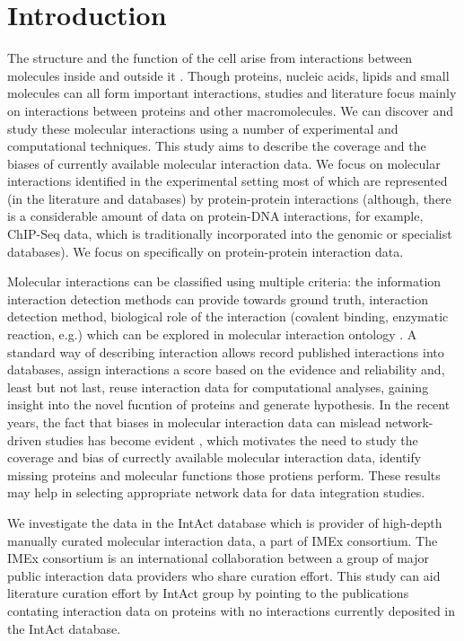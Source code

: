 \documentclass[12pt,]{report}
\begin{document}
\chapter{Introduction}\label{introduction}

The structure and the function of the cell arise from interactions
between molecules inside and outside it \citep{Hein:2015aa}. Though
proteins, nucleic acids, lipids and small molecules can all form
important interactions, studies and literature focus mainly on
interactions between proteins and other macromolecules. We can discover
and study these molecular interactions using a number of experimental
and computational techniques. This study aims to describe the coverage
and the biases of currently available molecular interaction data. We
focus on molecular interactions identified in the experimental setting
most of which are represented (in the literature and databases) by
protein-protein interactions (although, there is a considerable amount
of data on protein-DNA interactions, for example, ChIP-Seq data, which
is traditionally incorporated into the genomic or specialist databases).
We focus on specifically on protein-protein interaction data.

Molecular interactions can be classified using multiple criteria: the
information interaction detection methods can provide towards ground
truth, interaction detection method, biological role of the interaction
(covalent binding, enzymatic reaction, e.g.) which can be explored in
molecular interaction ontology
\citep[\url{http://www.ebi.ac.uk/ols/ontologies/mi/}]{Hermjakob:2004aa}.
A standard way of describing interaction allows record published
interactions into databases, assign interactions a score based on the
evidence and reliability and, least but not last, reuse interaction data
for computational analyses, gaining insight into the novel fucntion of
proteins and generate hypothesis. In the recent years, the fact that
biases in molecular interaction data can mislead network-driven studies
has become evident \citep{Schaefer:2015aa}, which motivates the need to
study the coverage and bias of currectly available molecular interaction
data, identify missing proteins and molecular functions those protiens
perform. These results may help in selecting appropriate network data
for data integration studies.

We investigate the data in the IntAct database \citep{Orchard:2014aa}
which is provider of high-depth manually curated molecular interaction
data, a part of IMEx consortium. The IMEx consortium
\citep{Orchard:2012aa} is an international collaboration between a group
of major public interaction data providers who share curation effort.
This study can aid literature curation effort by IntAct group by
pointing to the publications contating interaction data on proteins with
no interactions currently deposited in the IntAct database.
\end{document}
